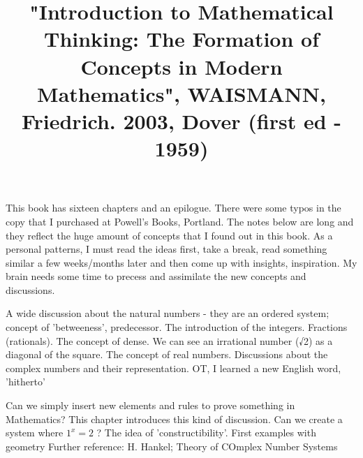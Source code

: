 \documentclass{cornell}
\begin{document}
 

\title{
    \vspace{-3em}
        \begin{tcolorbox}[colframe=white,opacityback=0]
            \begin{tcolorbox}
                \Huge\sffamily "Introduction to Mathematical Thinking: The Formation of Concepts in Modern Mathematics", WAISMANN, Friedrich. 2003, Dover (first ed - 1959)
            \end{tcolorbox}
        \end{tcolorbox}
    \vspace{-3em}
}
\maketitle

\begin{tcolorbox}
\end{tcolorbox}


\noindent
This book has sixteen chapters and an epilogue. There were some typos in the copy that I purchased at Powell's Books, Portland. The notes below are long and they reflect the huge amount of concepts that I found out in this book. As a personal patterns, I must read the ideas first, take a break, read something similar a few weeks/months later and then come up with insights, inspiration. My brain needs some time to precess and assimilate the new concepts and discussions. 

%
{A wide discussion about the natural numbers - they are an ordered system; concept of 'betweeness', predecessor. The introduction of the integers. Fractions (rationals). The concept of dense. We can see an irrational number (√2) as a diagonal of the square. The concept of real numbers. Discussions about the complex numbers and their representation. }%
{OT, I learned a new English word, 'hitherto'}%

%
{Can we simply insert new elements and rules to prove something in Mathematics? This chapter introduces this kind of discussion. Can we create a system where \( 1^x=2 \) ? The idea of 'constructibility'. First examples with geometry}%
{Further reference: H. Hankel; Theory of COmplex Number Systems}%
\end{document}
